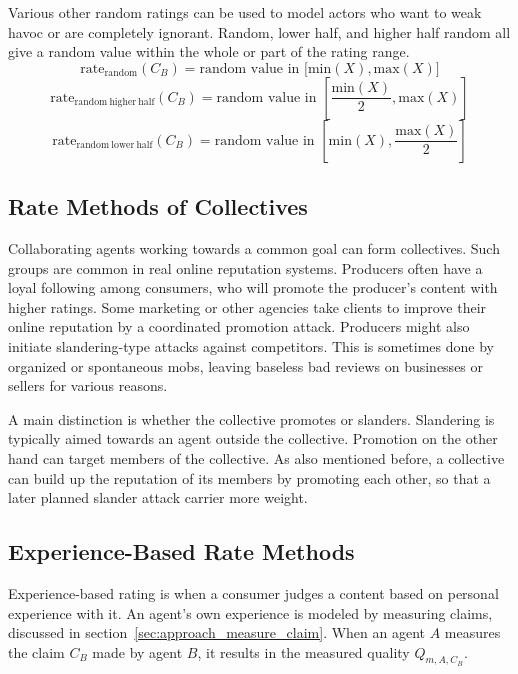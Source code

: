 \documentclass[%
    ]{\PathToTumTemplate/thesis/tum_thesis}
\begin{document}
Various other random ratings can be used to model actors who want to weak havoc or are completely ignorant.
Random, lower half, and higher half random all give a random value within the whole or part of the rating range.
\begin{equation}\label{eq:rate_random}
\mathrm{rate_{random}}(C_B) = \text{random value in $\big[\mathrm{min}(X), \mathrm{max}(X)\big]$}
\end{equation}
\begin{equation}\label{eq:rate_random_higher_half}
\mathrm{rate_{random~higher~half}}(C_B) = \text{random value in $\left[\frac{\mathrm{min}(X)}{2}, \mathrm{max}(X)\right]$}
\end{equation}
\begin{equation}\label{eq:rate_random_lower_half}
\mathrm{rate_{random~lower~half}}(C_B) = \text{random value in $\left[\mathrm{min}(X), \frac{\mathrm{max}(X)}{2}\right]$}
\end{equation}


\subsection{Rate Methods of Collectives}
Collaborating agents working towards a common goal can form collectives.
Such groups are common in real online reputation systems.
Producers often have a loyal following among consumers, who will promote the producer's content with higher ratings.
Some marketing or other agencies take clients to improve their online reputation by a coordinated promotion attack.
Producers might also initiate slandering-type attacks against competitors.
This is sometimes done by organized or spontaneous mobs, leaving baseless bad reviews on businesses or sellers for various reasons.

A main distinction is whether the collective promotes or slanders.
Slandering is typically aimed towards an agent outside the collective.
Promotion on the other hand can target members of the collective.
As also mentioned before, a collective can build up the reputation of its members by promoting each other, so that a later planned slander attack carrier more weight.

\subsection{Experience-Based Rate Methods}
Experience-based rating is when a consumer judges a content based on personal experience with it.
An agent's own experience is modeled by measuring claims, discussed in section~\ref{sec:approach_measure_claim}.
When an agent $A$ measures the claim $C_B$ made by agent $B$, it results in the measured quality $Q_{m,A,C_{B}}$.
\end{document}
